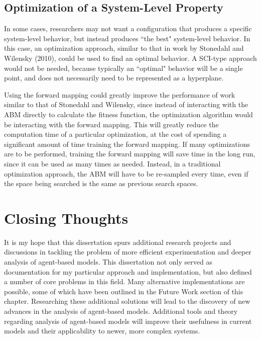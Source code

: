 \subsection{Optimization of a System-Level Property}

In some cases, researchers may not want a configuration that produces a specific system-level behavior, but instead produces ``the best" system-level behavior.
In this case, an optimization approach, similar to that in work by Stonedahl and Wilensky (2010)\nocite{stonedahl}, could be used to find an optimal behavior.
A SCI-type approach would not be needed, because typically an ``optimal" behavior will be a single point, and does not necessarily need to be represented as a hyperplane.

Using the forward mapping could greatly improve the performance of work similar to that of Stonedahl and Wilensky, since instead of interacting with the ABM directly to calculate the fitness function, the optimization algorithm would be interacting with the forward mapping.
This will greatly reduce the computation time of a particular optimization, at the cost of spending a significant amount of time training the forward mapping.
If many optimizations are to be performed, training the forward mapping will save time in the long run, since it can be used as many times as needed.
Instead, in a traditional optimization approach, the ABM will have to be re-sampled every time, even if the space being searched is the same as previous search spaces.


\section{Closing Thoughts}

It is my hope that this dissertation spurs additional research projects and discussions in tackling the problem of more efficient experimentation and deeper analysis of agent-based models.
This dissertation not only served as documentation for my particular approach and implementation, but also defined a number of core problems in this field.
Many alternative implementations are possible, some of which have been outlined in the Future Work section of this chapter.
Researching these additional solutions  will  lead to the discovery of new advances in the analysis of agent-based models.
Additional tools and theory regarding analysis of agent-based models will improve their usefulness in current models and their applicability to newer, more complex systems.


